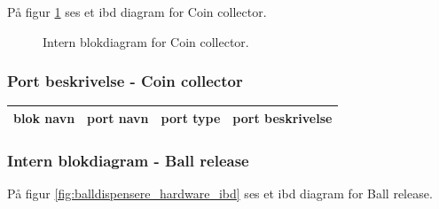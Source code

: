 \documentclass[Arkitektur/System_main.tex]{subfiles}
\begin{document}
På figur \ref{fig:coin_collector_hardware_ibd} ses et ibd diagram for Coin collector.

\begin{figure}[H]
    \centering
    \caption{Intern blokdiagram for Coin collector.}
    \label{fig:coin_collector_hardware_ibd}
\end{figure}

\subsubsection{Port beskrivelse - Coin collector} \label{sec:coin_collector_hardware_ports}


\begin{table}[]
\begin{tabular}{|l|l|l|l|}
\hline
blok navn & port navn & port type & port beskrivelse \\ \hline
\end{tabular}
\end{table}


\subsubsection{Intern blokdiagram - Ball release} \label{sec:ball_release_hardware_ibd}

På figur \ref{fig:balldispensere_hardware_ibd} ses et ibd diagram for Ball release.
\end{document}
